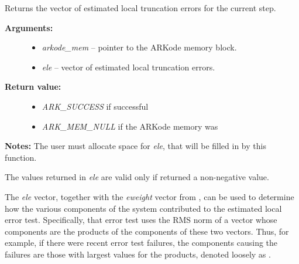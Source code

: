\documentclass[letterpaper,10pt,english]{sphinxmanual}
\begin{document}
\begin{fulllineitems}
\label{c_interface/User_callable:ARKodeGetEstLocalErrors}
Returns the vector of estimated local truncation errors
for the current step.
\begin{description}
\item[{\textbf{Arguments:}}] \leavevmode\begin{itemize}
\item {} 
\emph{arkode\_mem} -- pointer to the ARKode memory block.

\item {} 
\emph{ele} -- vector of estimated local truncation errors.

\end{itemize}

\item[{\textbf{Return value:}}] \leavevmode\begin{itemize}
\item {} 
\emph{ARK\_SUCCESS} if successful

\item {} 
\emph{ARK\_MEM\_NULL} if the ARKode memory was 

\end{itemize}

\end{description}

\textbf{Notes:}  The user must allocate space for \emph{ele}, that will be
filled in by this function.

The values returned in \emph{ele} are valid only if {\hyperref[c_interface/User_callable:ARKode]{}}
returned a non-negative value.

The \emph{ele} vector, together with the \emph{eweight} vector from
{\hyperref[c_interface/User_callable:ARKodeGetErrWeights]{}}, can be used to determine how the
various components of the system contributed to the estimated local
error test.  Specifically, that error test uses the RMS norm of a
vector whose components are the products of the components of these
two vectors.  Thus, for example, if there were recent error test
failures, the components causing the failures are those with largest
values for the products, denoted loosely as .

\end{fulllineitems}

\end{document}
